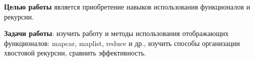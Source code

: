 \Introduction

\textbf{Целью работы} является приобретение навыков использования функционалов и рекурсии.

\textbf{Задачи работы}: изучить работу и методы использования отображающих функционалов: mapcar, maplist, reduce и др., изучить способы организации хвостовой рекурсии, сравнить эффективность.

